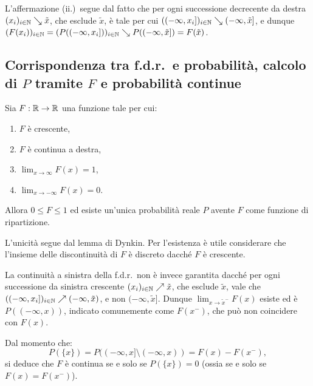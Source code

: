 \begin{multicols*}{2}
\begin{proposition}
    L'affermazione (ii.)~segue dal fatto che per ogni successione decrecente da destra $(x_i)_{i \in \mathbb{N}} \searrow \tilde{x}$,
    che esclude $\tilde{x}$, è
    tale per cui $((-\infty, x_i])_{i \in \mathbb{N}} \searrow (-\infty, \tilde{x}]$, e dunque
    $(F(x_i))_{i \in \mathbb{N}} = (P((-\infty, x_i]))_{i \in \mathbb{N}} \searrow P((-\infty, \tilde{x}]) = F(\tilde{x})$.
\end{proposition}

\subsection{Corrispondenza tra f.d.r.~e probabilità, calcolo di \texorpdfstring{$P$}{P} tramite \texorpdfstring{$F$}{F} e probabilità continue}

\begin{proposition}
    \label{prop:unicita_fdr}
    Sia $F : \mathbb{R} \to \mathbb{R}$ una funzione tale per cui:
    \begin{enumerate}[(i.)]
        \item $F$ è crescente,
        \item $F$ è continua a destra,
        \item $\lim_{x \to \infty} F(x) = 1$,
        \item $\lim_{x \to -\infty} F(x) = 0$.
    \end{enumerate}
    Allora $0 \leq F \leq 1$ ed esiste un'unica probabilità reale $P$ avente
    $F$ come funzione di ripartizione. \smallskip


    L'unicità segue dal lemma di Dynkin. Per l'esistenza è utile considerare
    che l'insieme delle discontinuità di $F$ è discreto dacché
    $F$ è crescente.
\end{proposition}

\begin{remark}
    La continuità a sinistra della f.d.r.~non è invece garantita dacché per ogni successione da sinistra crescente
    $(x_i)_{i \in \mathbb{N}} \nearrow \tilde{x}$, che esclude $\tilde{x}$,
    vale che $((-\infty, x_i])_{i \in \mathbb{N}} \nearrow (-\infty, \tilde{x})$, e non
    $(-\infty, \tilde{x}]$. Dunque $\lim_{x \to \tilde{x}^-} F(x)$ esiste ed è $P((-\infty, x))$, indicato
    comunemente come $F(x^-)$, che può non coincidere con $F(x)$. \smallskip

    Dal momento che:
    \[
        P(\{x\}) = P((-\infty, x] \setminus (-\infty, x)) = F(x) - F(x^-),
    \]
    si deduce che $F$ è continua se e solo se $P(\{x\}) = 0$ (ossia se e solo se
    $F(x) = F(x^-)$).
\end{remark}


\end{multicols*}
